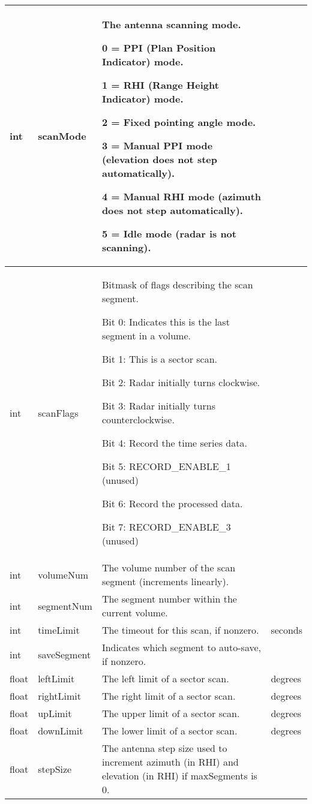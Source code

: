 \documentclass[10pt]{article}
\newcommand{\tblspc}{\rule{0pt}{3ex}}
\begin{document}
\begin{longtable}{|p{}|l|p{}|p{}|}
\hline
\tblspc int & scanMode & The antenna scanning mode.
	\par 0 = PPI (Plan Position Indicator) mode.
	\par 1 = RHI (Range Height Indicator) mode.
	\par 2 = Fixed pointing angle mode.
	\par 3 = Manual PPI mode (elevation does not step automatically).
	\par 4 = Manual RHI mode (azimuth does not step automatically).
	\par 5 = Idle mode (radar is not scanning). & \\
\hline
\tblspc int & scanFlags & Bitmask of flags describing the scan segment.
	\par Bit 0: Indicates this is the last segment in a volume.
	\par Bit 1: This is a sector scan.
	\par Bit 2: Radar initially turns clockwise.
	\par Bit 3: Radar initially turns counterclockwise.
	\par Bit 4: Record the time series data.
	\par Bit 5: RECORD\_ENABLE\_1 (unused)
	\par Bit 6: Record the processed data.
	\par Bit 7: RECORD\_ENABLE\_3 (unused) & \\
\hline
\tblspc int & volumeNum & The volume number of the scan segment (increments linearly). & \\
\hline
\tblspc int & segmentNum & The segment number within the current volume. & \\
\hline
\tblspc int & timeLimit & The timeout for this scan, if nonzero. & seconds \\
\hline
\tblspc int & saveSegment & Indicates which segment to auto-save, if nonzero. & \\
\hline
\tblspc float & leftLimit & The left limit of a sector scan. & degrees \\
\hline
\tblspc float & rightLimit & The right limit of a sector scan. & degrees \\
\hline
\tblspc float & upLimit & The upper limit of a sector scan. & degrees \\
\hline
\tblspc float & downLimit & The lower limit of a sector scan. & degrees \\
\hline
\tblspc float & stepSize & The antenna step size used to increment azimuth (in RHI) and elevation (in RHI) if maxSegments is 0. & \\

\end{longtable}
\end{document}
